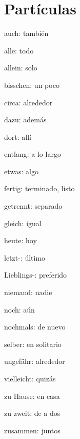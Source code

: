 \section{Partículas}
\begin{multicols}{3}
\begin{myitemize}
\item auch: también
\item alle: todo
\item allein: solo
\item bisschen: un poco
\item circa: alrededor
\item dazu: además
\item dort: allí
\item entlang: a lo largo
\item etwas: algo
\item fertig: terminado, listo
\item getrennt: separado
\item gleich: igual
\item heute: hoy
\item letzt-: último
\item Lieblings-: preferido
\item niemand: nadie
\item noch: aún
\item nochmals: de nuevo
\item selber: en solitario
\item ungefähr: alrededor
\item vielleicht: quizás
\item zu Hause: en casa
\item zu zweit: de a dos
\item zusammen: juntos
\end{myitemize}
\end{multicols}


